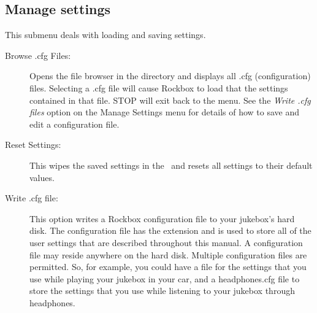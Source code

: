 \subsection{Manage settings}
This submenu deals with loading and saving settings. 
%
  \begin{description}
    \item [Browse .cfg Files: ]Opens the file browser in the 
     directory and displays all .cfg (configuration) files.
    Selecting a .cfg file will cause Rockbox to load that the settings
    contained in that file.  STOP will exit back to the menu. 
    See the \emph{Write .cfg files} option on the Manage Settings menu for
    details of how to save and edit a configuration file.
    \item [Reset Settings: ]This wipes the saved settings in the \dap\ and
    resets all settings to their default values. 
    \item [Write .cfg file: ]This option writes a Rockbox configuration file
    to your jukebox's hard disk. The configuration file has the 
    extension and is used to store all of the user settings that are described
    throughout this manual.
    A configuration file may reside anywhere on the hard disk. Multiple
    configuration files are permitted. So, for example, you could have 
    a  file for the settings that you use while playing your
    jukebox in your car, and a headphones.cfg file to store the settings that
    you use while listening to your jukebox through headphones.


\end{description}
